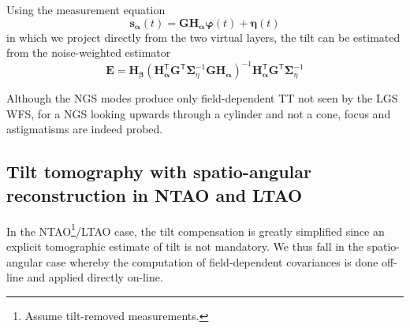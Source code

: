 \documentclass[a4paper,12pt]{article}
\newcommand{\T}{\mathsf{T}} %
\newcommand{\0}{\mathsf{0}} %
\newcommand{\Proj}{\mathbf{H}} %
\newcommand{\Emv}{\mathbf{E}} %
\newcommand{\CovMat}{\boldsymbol{\Sigma}} %
\newcommand{\D}{\mathbf{G}} %
\newcommand{\alphavec}{{\boldsymbol{\alpha}}}
\newcommand{\betavec}{{\boldsymbol{\beta}}}
\newcommand{\etavec}{{\boldsymbol{\eta}}}
\newcommand{\varphivec}{{\boldsymbol{\varphi}}}
\newcommand{\svec}{{\mathbf{s}}}
\newcommand{\Proj}{\mathbf{P}} %
\begin{document}
Using the measurement equation
\begin{equation}\label{eq:fwd_MOAO_meas_model}
\svec_\alphavec(t) = \D \Proj_\alphavec\varphivec (t) + \etavec(t)
\end{equation}
in which we project directly from the two virtual layers, the tilt can
be estimated from the noise-weighted estimator
\begin{equation}
\Emv =   \Proj_\betavec\left(\Proj_\alphavec^\T\D^\T\CovMat_\eta^{-1} \D \Proj_\alphavec\right)^{-1}\Proj_\alphavec^\T\D^\T\CovMat_\eta^{-1}
\end{equation}


Although the NGS modes
produce only field-dependent TT not seen by the LGS WFS, for a NGS
looking upwards through a cylinder and not a cone, focus and
astigmatisms are indeed probed.


\subsection {Tilt tomography with spatio-angular reconstruction in NTAO and LTAO}

In the NTAO\footnote{Assume tilt-removed measurements.}/LTAO case, the tilt compensation is greatly simplified
since an explicit tomographic estimate of tilt is not mandatory. We
thus fall in the spatio-angular case whereby the computation of
field-dependent covariances is done off-line and applied directly
on-line. 
\end{document}
